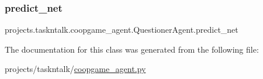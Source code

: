 \subsubsection{\texorpdfstring{predict\+\_\+net}{predict\_net}}
{\footnotesize\ttfamily projects.\+taskntalk.\+coopgame\+\_\+agent.\+Questioner\+Agent.\+predict\+\_\+net}



The documentation for this class was generated from the following file\+:\begin{DoxyCompactItemize}
\item 
projects/taskntalk/\hyperlink{coopgame__agent_8py}{coopgame\+\_\+agent.\+py}\end{DoxyCompactItemize}

